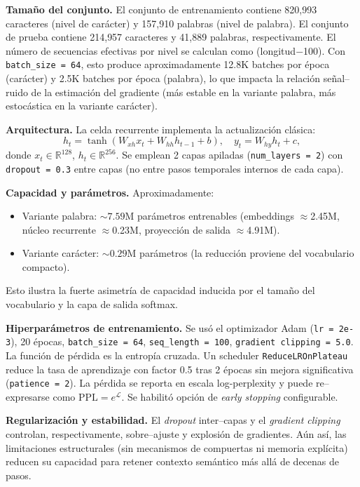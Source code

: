 \documentclass[paper=letter, fontsize=11pt, draft=false]{scrartcl}
\numberwithin{equation}{section} %
\numberwithin{figure}{section} %
\numberwithin{table}{section} %
\numberwithin{subsection}{section}
\begin{document}
	\textbf{Tamaño del conjunto.} El conjunto de entrenamiento contiene 820{,}993 caracteres (nivel de carácter) y 157{,}910 palabras (nivel de palabra). El conjunto de prueba contiene 214{,}957 caracteres y 41{,}889 palabras, respectivamente. El número de secuencias efectivas por nivel se calculan como (longitud$-$100). Con \texttt{batch\_size = 64}, esto produce aproximadamente 12.8K batches por época (carácter) y 2.5K batches por época (palabra), lo que impacta la relación señal–ruido de la estimación del gradiente (más estable en la variante palabra, más estocástica en la variante carácter).

	\textbf{Arquitectura.} La celda recurrente implementa la actualización clásica:
\[
h_t = \tanh(W_{xh} x_t + W_{hh} h_{t-1} + b),\quad y_t = W_{hy} h_t + c,
\]
donde $x_t \in \mathbb{R}^{128}$, $h_t \in \mathbb{R}^{256}$. Se emplean 2 capas apiladas (\texttt{num\_layers = 2}) con \texttt{dropout = 0.3} entre capas (no entre pasos temporales internos de cada capa).

\textbf{Capacidad y parámetros.} Aproximadamente:
\begin{itemize}
    \item Variante palabra: $\sim 7.59$M parámetros entrenables (embeddings $\approx$2.45M, núcleo recurrente $\approx$0.23M, proyección de salida $\approx$4.91M).
    \item Variante carácter: $\sim 0.29$M parámetros (la reducción proviene del vocabulario compacto).
\end{itemize}
Esto ilustra la fuerte asimetría de capacidad inducida por el tamaño del vocabulario y la capa de salida softmax.

	\textbf{Hiperparámetros de entrenamiento.} Se usó el optimizador Adam (\texttt{lr = 2e-3}), 20 épocas, \texttt{batch\_size = 64}, \texttt{seq\_length = 100}, \texttt{gradient clipping = 5.0}. La función de pérdida es la entropía cruzada. Un scheduler \texttt{ReduceLROnPlateau} reduce la tasa de aprendizaje con factor 0.5 tras 2 épocas sin mejora significativa (\texttt{patience = 2}). La pérdida se reporta en escala log-perplexity y puede re–expresarse como $\text{PPL} = e^{\mathcal{L}}$. Se habilitó opción de \emph{early stopping} configurable.

	\textbf{Regularización y estabilidad.} El \emph{dropout} inter–capas y el \emph{gradient clipping} controlan, respectivamente, sobre–ajuste y explosión de gradientes. Aún así, las limitaciones estructurales (sin mecanismos de compuertas ni memoria explícita) reducen su capacidad para retener contexto semántico más allá de decenas de pasos.
\end{document}

